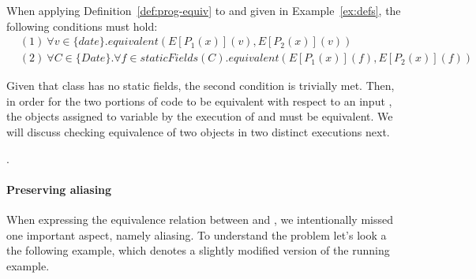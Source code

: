 \documentclass[runningheads,a4paper]{llncs}
\begin{document}
\begin{example}\label{ex:equiv}
  When applying Definition~\ref{def:prog-equiv} to  and  given in Example~\ref{ex:defs},
  the following conditions must hold:
\[
    \begin{aligned}
& (1)~ \forall v\in \{date\}. equivalent(E[P_1(x)](v), E[P_2(x)](v))\\
& (2)~  \forall C \in \{Date\}.\forall f \in staticFields(C).equivalent(E[P_1(x)](f), E[P_2(x)](f))
    \end{aligned}
    \]

    Given that class  has no static fields, the second condition is trivially met. Then, in order for the two portions of code to be
    equivalent with respect to an input , the objects assigned to variable  by the execution of   and 
    must be equivalent. We will discuss checking equivalence of two objects in two distinct executions next.
    
\end{example}

.

\paragraph{Preserving aliasing}
When expressing the equivalence relation between  and , we intentionally missed one important aspect,
namely aliasing. To understand the problem let's look a the following example, which denotes a slightly
modified version of the running example.
\end{document}
